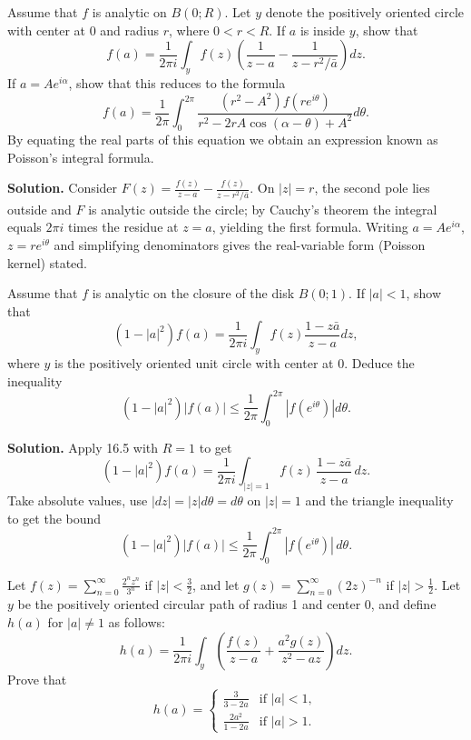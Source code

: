 \begin{problembox}
Assume that \( f \) is analytic on \( B(0; R) \). Let \( y \) denote the positively oriented circle with center at 0 and radius \( r \), where \( 0 < r < R \). If \( a \) is inside \( y \), show that
\[f(a) = \frac{1}{2\pi i} \int_{y} f(z) \left( \frac{1}{z - a} - \frac{1}{z - r^2 / \bar{a}} \right) dz.\]
If \( a = Ae^{i\alpha} \), show that this reduces to the formula
\[f(a) = \frac{1}{2\pi} \int_0^{2\pi} \frac{(r^2 - A^2)f(re^{i\theta})}{r^2 - 2rA \cos (\alpha - \theta) + A^2} d\theta.\]
By equating the real parts of this equation we obtain an expression known as Poisson's integral formula.
\end{problembox}

\noindent\textbf{Solution.}
Consider $F(z)=\frac{f(z)}{z-a}-\frac{f(z)}{z-r^2/\bar a}$. On $|z|=r$, the second pole lies outside and $F$ is analytic outside the circle; by Cauchy's theorem the integral equals $2\pi i$ times the residue at $z=a$, yielding the first formula. Writing $a=Ae^{i\alpha}$, $z=re^{i\theta}$ and simplifying denominators gives the real-variable form (Poisson kernel) stated.

\begin{problembox}
Assume that \( f \) is analytic on the closure of the disk \( B(0; 1) \). If \( |a| < 1 \), show that
\[(1 - |a|^2)f(a) = \frac{1}{2\pi i} \int_{y} f(z) \frac{1 - z\bar{a}}{z - a} dz,\]
where \( y \) is the positively oriented unit circle with center at 0. Deduce the inequality
\[(1 - |a|^2) |f(a)| \leq \frac{1}{2\pi} \int_0^{2\pi} |f(e^{i\theta})| d\theta.\]
\end{problembox}

\noindent\textbf{Solution.}
Apply 16.5 with $R=1$ to get
\[(1-|a|^2)f(a)=\frac{1}{2\pi i}\int_{|z|=1} f(z)\,\frac{1-z\bar a}{z-a}\,dz.\]
Take absolute values, use $|dz|=|z|d\theta=d\theta$ on $|z|=1$ and the triangle inequality to get the bound
\[(1-|a|^2)|f(a)|\le \frac{1}{2\pi}\int_0^{2\pi}|f(e^{i\theta})|\,d\theta.\]

\begin{problembox}
Let \( f(z) = \sum_{n=0}^{\infty} \frac{2^n z^n}{3^n} \) if \( |z| < \frac{3}{2} \), and let \( g(z) = \sum_{n=0}^{\infty} (2z)^{-n} \) if \( |z| > \frac{1}{2} \). Let \( y \) be the positively oriented circular path of radius 1 and center 0, and define \( h(a) \) for \( |a| \neq 1 \) as follows:
\[h(a) = \frac{1}{2\pi i} \int_y \left( \frac{f(z)}{z - a} + \frac{a^2 g(z)}{z^2 - az} \right) dz.\]
Prove that
\[h(a) = \begin{cases} 
\frac{3}{3 - 2a} & \text{if } |a| < 1, \\ 
\frac{2a^2}{1 - 2a} & \text{if } |a| > 1.
\end{cases}\]
\end{problembox}

